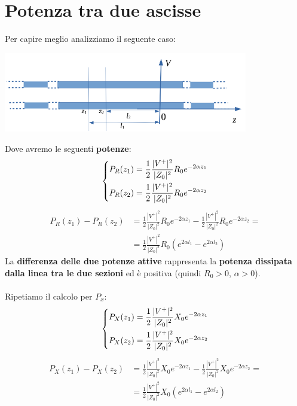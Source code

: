 \section{Potenza tra due ascisse}
Per capire meglio analizziamo il seguente caso:
\begin{center}
    \includegraphics[width=0.8\textwidth]{Images/figure19.png}
\end{center}
Dove avremo le seguenti \textbf{potenze}:
\begin{equation*}
    \begin{dcases}
    P_R(z_1) = \frac{1}{2}\frac{|V^+|^2}{|Z_0|^2} R_0 e^{-2\alpha z_1}\\
    P_R(z_2) = \frac{1}{2}\frac{|V^+|^2}{|Z_0|^2} R_0 e^{-2\alpha z_2}
    \end{dcases}
\end{equation*}
\begin{equation*}
\begin{aligned}
    P_R(z_1) - P_R(z_2) &= \frac{1}{2}\frac{|V^+|^2}{|Z_0|^2} R_0 e^{-2\alpha z_1} - \frac{1}{2}\frac{|V^+|^2}{|Z_0|^2} R_0 e^{-2\alpha z_2} = \\
    &= \frac{1}{2}\frac{|V^+|^2}{|Z_0|^2} R_0\left(e^{2\alpha l_1} - e^{2\alpha l_2}\right)
\end{aligned}
\end{equation*}
La \textbf{differenza delle due potenze attive} rappresenta la \textbf{potenza dissipata dalla linea tra le due sezioni} ed è positiva (quindi $R_0 >0$, $\alpha>0$).\\ \\
Ripetiamo il calcolo per $P_x$:
\begin{equation*}
    \begin{dcases}
    P_X(z_1) = \frac{1}{2}\frac{|V^+|^2}{|Z_0|^2} X_0 e^{-2\alpha z_1}\\
    P_X(z_2) = \frac{1}{2}\frac{|V^+|^2}{|Z_0|^2} X_0 e^{-2\alpha z_2}
    \end{dcases}
\end{equation*}
\begin{equation*}
\begin{aligned}
    P_X(z_1) - P_X(z_2) &= \frac{1}{2}\frac{|V^+|^2}{|Z_0|^2} X_0 e^{-2\alpha z_1} - \frac{1}{2}\frac{|V^+|^2}{|Z_0|^2} X_0 e^{-2\alpha z_2} = \\
    &= \frac{1}{2}\frac{|V^+|^2}{|Z_0|^2} X_0\left(e^{2\alpha l_1} - e^{2\alpha l_2}\right)
\end{aligned}
\end{equation*}
